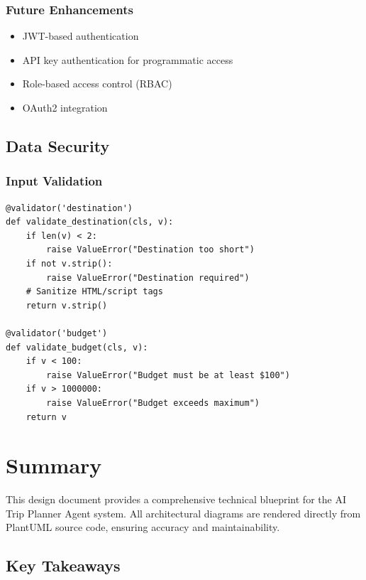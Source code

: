 \documentclass[12pt,a4paper]{report}
\begin{document}
\subsection{Future Enhancements}
\begin{itemize}
    \item JWT-based authentication
    \item API key authentication for programmatic access
    \item Role-based access control (RBAC)
    \item OAuth2 integration
\end{itemize}

\section{Data Security}

\subsection{Input Validation}

\begin{lstlisting}[style=pythonstyle, caption={Pydantic Validators}]
@validator('destination')
def validate_destination(cls, v):
    if len(v) < 2:
        raise ValueError("Destination too short")
    if not v.strip():
        raise ValueError("Destination required")
    # Sanitize HTML/script tags
    return v.strip()

@validator('budget')
def validate_budget(cls, v):
    if v < 100:
        raise ValueError("Budget must be at least $100")
    if v > 1000000:
        raise ValueError("Budget exceeds maximum")
    return v
\end{lstlisting}


\chapter*{Summary}

This design document provides a comprehensive technical blueprint for the AI Trip Planner Agent system. All architectural diagrams are rendered directly from PlantUML source code, ensuring accuracy and maintainability.

\section*{Key Takeaways}
\end{document}
